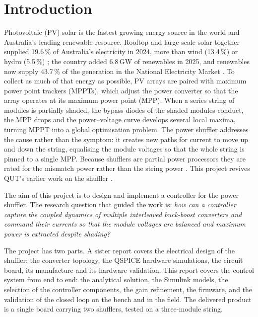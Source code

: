 \section{Introduction}
\label{sec:intro}

Photovoltaic (PV) solar is the fastest-growing energy source in the world \cite{noauthor_world_2025} and Australia's leading renewable resource. Rooftop and large-scale solar together supplied 19.6\,\% of Australia's electricity in 2024, more than wind (13.4\,\%) or hydro (5.5\,\%) \cite{clean_energy_council_clean_2025}; the country added 6.8\,GW of renewables in 2025, and renewables now supply 43.7\,\% of the generation in the National Electricity Market \cite{noauthor_quarterly_2026}. To collect as much of that energy as possible, PV arrays are paired with maximum power point trackers (MPPTs), which adjust the power converter so that the array operates at its maximum power point (MPP). When a series string of modules is partially shaded, the bypass diodes of the shaded modules conduct, the MPP drops and the power--voltage curve develops several local maxima, turning MPPT into a global optimisation problem. The power shuffler addresses the cause rather than the symptom: it creates new paths for current to move up and down the string, equalising the module voltages so that the whole string is pinned to a single MPP. Because shufflers are partial power processors they are rated for the mismatch power rather than the string power \cite{kasper_classification_2014,olalla_performance_2014}. This project revives QUT's earlier work on the shuffler \cite{walker_pv_2003}.

The aim of this project is to design and implement a controller for the power shuffler. The research question that guided the work is: \emph{how can a controller capture the coupled dynamics of multiple interleaved buck-boost converters and command their currents so that the module voltages are balanced and maximum power is extracted despite shading?}

The project has two parts. A sister report covers the electrical design of the shuffler: the converter topology, the QSPICE hardware simulations, the circuit board, its manufacture and its hardware validation. This report covers the control system from end to end: the analytical solution, the Simulink models, the selection of the controller components, the gain refinement, the firmware, and the validation of the closed loop on the bench and in the field. The delivered product is a single board carrying two shufflers, tested on a three-module string.

